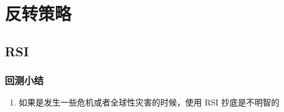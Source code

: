 \chapter{反转策略}
\section{RSI}
\subsection{回测小结}

\begin{tcolorbox}
    \begin{enumerate}
        \item 如果是发生一些危机或者全球性灾害的时候，使用 RSI 抄底是不明智的
    \end{enumerate}
\end{tcolorbox}
